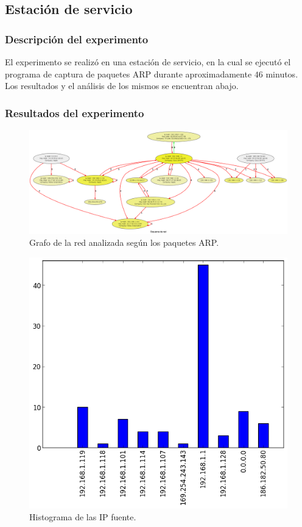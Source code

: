 \subsection{Estación de servicio}
\subsubsection{Descripción del experimento}
El experimento se realizó en una estación de servicio, en la cual se ejecutó el programa de captura de paquetes ARP durante aproximadamente $46$ minutos. Los resultados y el análisis de los mismos se encuentran abajo.

\subsubsection{Resultados del experimento}

\begin{landscape}
\begin{figure}[H]
  \centering	
	\includegraphics[scale=0.30]{../experimentacion-barbeiton/graph.png}
  \caption{Grafo de la red analizada según los paquetes ARP.}
\end{figure}
\end{landscape}

\begin{figure}[H]
  \centering	
	\includegraphics[scale=0.66]{../experimentacion-barbeiton/histogram_src.png}
  \caption{Histograma de las IP fuente.}
\end{figure}

